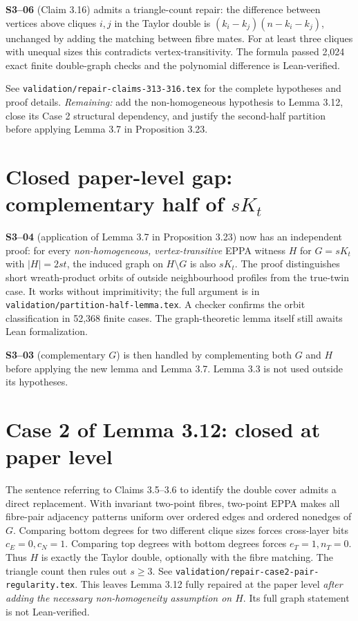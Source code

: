 \documentclass[11pt,a4paper]{article}
\begin{document}
\textbf{S3--06} (Claim 3.16) admits a triangle-count
repair: the difference between vertices above cliques
\(i,j\) in the Taylor double is
\((k_i-k_j)(n-k_i-k_j)\), unchanged by adding
the matching between fibre mates. For at least
three cliques with unequal sizes this contradicts
vertex-transitivity. The formula passed 2,024
exact finite double-graph checks and the polynomial
difference is Lean-verified.

See \texttt{validation/repair-claims-313-316.tex}
for the complete hypotheses and proof details.
\emph{Remaining:} add the non-homogeneous hypothesis
to Lemma 3.12, close its Case 2 structural dependency,
and justify the second-half partition before applying
Lemma 3.7 in Proposition 3.23.

\section*{Closed paper-level gap: complementary half of \(sK_t\)}
\textbf{S3--04} (application of Lemma 3.7 in
Proposition 3.23) now has an independent proof:
for every \emph{non-homogeneous, vertex-transitive}
EPPA witness \(H\) for \(G=sK_t\) with
\(|H|=2st\), the induced graph on \(H\setminus G\)
is also \(sK_t\). The proof distinguishes short
wreath-product orbits of outside neighbourhood
profiles from the true-twin case. It works without
imprimitivity; the full argument is in
\texttt{validation/partition-half-lemma.tex}.
A checker confirms the orbit classification in
52,368 finite cases. The graph-theoretic lemma
itself still awaits Lean formalization.

\textbf{S3--03} (complementary \(G\)) is then handled
by complementing both \(G\) and \(H\) before applying
the new lemma and Lemma 3.7. Lemma 3.3 is not
used outside its hypotheses.

\section*{Case 2 of Lemma 3.12: closed at paper level}
The sentence referring to Claims 3.5--3.6 to
identify the double cover admits a direct
replacement. With invariant two-point fibres,
two-point EPPA makes all fibre-pair adjacency
patterns uniform over ordered edges and
ordered nonedges of \(G\).
Comparing bottom degrees for two different
clique sizes forces cross-layer bits
\(c_E=0,c_N=1\). Comparing top degrees with
bottom degrees forces \(e_T=1,n_T=0\).
Thus \(H\) is exactly the Taylor double,
optionally with the fibre matching. The
triangle count then rules out \(s\ge3\).
See \texttt{validation/repair-case2-pair-regularity.tex}.
This leaves Lemma 3.12 fully repaired at the
paper level \emph{after adding the necessary
non-homogeneity assumption on \(H\)}.
Its full graph statement is not Lean-verified.
\end{document}
